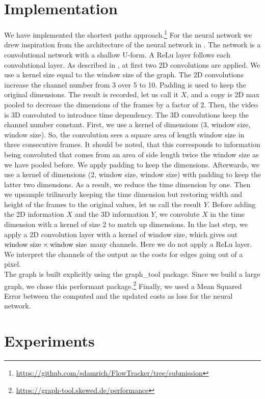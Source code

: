 \documentclass{article}
\begin{document}
{\section{Implementation}\label{Implementation}
We have implemented the shortest paths approach.\footnote{\url{https://github.com/sdamrich/FlowTracker/tree/submission}}  For the neural network we drew inspiration from the architecture of the neural network in \cite{Lee17}. The network is a convolutional network with a shallow U-form. A ReLu layer follows each convolutional layer. As described in \cite{Lee17}, at first two 2D convolutions are applied. We use a kernel size equal to the window size of the graph. The 2D convolutions increase the channel number from 3 over 5 to 10. Padding is used to keep the original dimensions. The result is recorded, let us call it $X$, and a copy is 2D max pooled to decrease the dimensions of the frames by a factor of 2. Then, the video is 3D convoluted to introduce time dependency. The 3D convolutions keep the channel number constant.  First, we use a kernel of dimensions (3, window size, window size). So, the convolution sees a square area of length window size in three consecutive frames. It should be noted, that this corresponds to information being convoluted that comes from an area of side length twice the window size as we have pooled before. We apply padding to keep the dimensions. Afterwards, we use a kernel of dimensions (2, window size, window size) with padding to keep the latter two dimensions. As a result, we reduce the time dimension by one. Then we upsample trilinearly keeping the time dimension but restoring width and height of the frames to the original values, let us call the result $Y$. Before adding the 2D information $X$ and the 3D information $Y$, we convolute $X$ in the time dimension with a kernel of size 2 to match up dimensions. 
In the last step, we apply a 2D convolution layer with a kernel of window size, which gives out $\textnormal{window size}\times\textnormal{window size}$ many channels. Here we do not apply a ReLu layer. We interpret the channels of the output as the costs for edges going out of a pixel.\\ 
The graph is built explicitly using the 
graph\_tool package. Since we build a large graph, we chose this performant package.\footnote{\url{https://graph-tool.skewed.de/performance}} Finally, we used a Mean Squared Error between the computed and the updated costs as loss for the neural network.

\section{Experiments}
}
\end{document}
